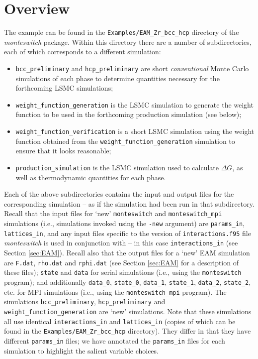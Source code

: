 \documentclass{report}
\begin{document}
\section{Overview}
The example can be found in the \texttt{Examples/EAM\_Zr\_bcc\_hcp} directory of the \emph{monteswitch} package. Within this directory
there are a number of subdirectories, each of which corresponds to a different simulation:
\begin{itemize}
\item \texttt{bcc\_preliminary} and \texttt{hcp\_preliminary} are short \emph{conventional} Monte Carlo simulations of each phase to determine
quantities necessary for the forthcoming LSMC simulations;
\item \texttt{weight\_function\_generation} is the LSMC simulation to generate the weight function to be used in the forthcoming production simulation
(see below);
\item \texttt{weight\_function\_verification} is a short LSMC simulation using the weight function obtained from the 
\texttt{weight\_function\_generation} simulation to ensure that it looks reasonable;
\item \texttt{production\_simulation} is the LSMC simulation used to calculate $\Delta G$, as well as thermodynamic quantities for each phase.
\end{itemize} 
Each of the above subdirectories contains the input and output files for the corresponding simulation -- as if the simulation had been run in that
subdirectory. 
Recall that the input files for `new' \texttt{monteswitch} and \texttt{monteswitch\_mpi} simulations (i.e., simulations invoked using the \texttt{-new} 
argument) are \texttt{params\_in}, \texttt{lattices\_in}, and any input files specific to the version of \texttt{interactions.f95} file \emph{monteswitch} 
is used in conjunction with -- in this case \texttt{interactions\_in} (see Section \ref{sec:EAM}). Recall also that the output files for a `new' 
EAM simulation are \texttt{F.dat}, \texttt{rho.dat} and \texttt{rphi.dat} (see Section \ref{sec:EAM} for a description of these files); \texttt{state} and 
\texttt{data} for serial simulations (i.e., using the \texttt{monteswitch} program); and additionally \texttt{data\_0}, \texttt{state\_0}, \texttt{data\_1}, 
\texttt{state\_1}, \texttt{data\_2}, \texttt{state\_2}, etc. for MPI simulations (i.e., using the \texttt{monteswitch\_mpi} program). The simulations 
\texttt{bcc\_preliminary}, \texttt{hcp\_preliminary} and \texttt{weight\_function\_generation} are `new' simulations. Note that these simulations 
all use identical \texttt{interactions\_in} and \texttt{lattices\_in} (copies of which can be found in the \texttt{Examples/EAM\_Zr\_bcc\_hcp} directory). 
They differ in that they have different \texttt{params\_in} files; we have annotated the \texttt{params\_in} files for each simulation to highlight the 
salient variable choices.
\end{document}
